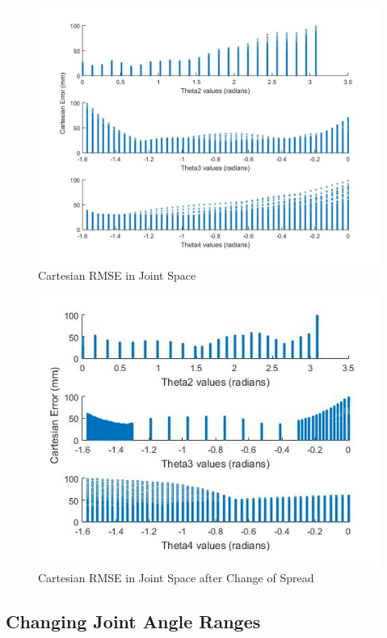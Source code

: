 \documentclass[11.5pt, twoside, a4paper]{article}
\begin{document}
\begin{figure}
\includegraphics[width=\linewidth]{cartesianerrorsTHETA.jpg}
\caption{Cartesian RMSE in Joint Space\label{fig:carterrors}}
\end{figure}

\begin{figure}
\includegraphics[width=\linewidth]{spreadChange.jpg}
\caption{Cartesian RMSE in Joint Space after Change of Spread\label{fig:spread}}
\end{figure}

\subsection{Changing Joint Angle Ranges}
\end{document}
